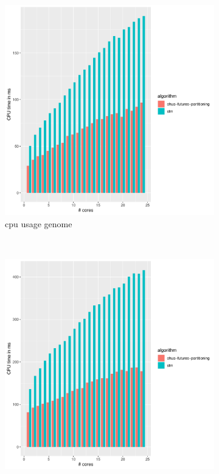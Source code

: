 \begin{figure}
    \begin{subfigure}[t]{.32\textwidth}
        \includegraphics[width=\textwidth,keepaspectratio]{gfx/results/genome/genome_cpu}
        \caption{cpu usage genome}%
    \end{subfigure}%
    ~
    \begin{subfigure}[t]{.32\textwidth}
        \includegraphics[width=\textwidth,keepaspectratio]{gfx/results/genome/genome+_cpu}

\end{subfigure}
\end{figure}
